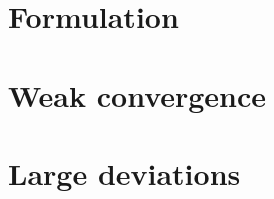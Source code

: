 

\section{Formulation}
\label{skorokhod:topological}


\section{Weak convergence}
\label{skorokhod:convergence}


\section{Large deviations}
\label{skorokhod:large-deviations}

